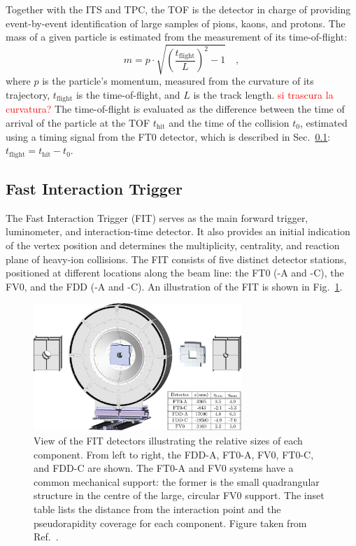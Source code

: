 Together with the ITS and TPC, the TOF is the detector in charge of providing event-by-event identification of large samples of pions, kaons, and protons. The mass of a given particle is estimated from the measurement of its time-of-flight:
\begin{equation}
    m = p \cdot \sqrt{\left(\frac{t_\mathrm{flight}}{L}\right)^2 - 1}\quad ,
\end{equation} 
where $p$ is the particle's momentum, measured from the curvature of its trajectory, $t_\mathrm{flight}$ is the time-of-flight, and $L$ is the track length. \textcolor{red}{si trascura la curvatura?} The time-of-flight is evaluated as the difference between the time of arrival of the particle at the TOF $t_\mathrm{hit}$ and the time of the collision $t_0$, estimated using a timing signal from the FT0 detector, which is described in Sec.~\ref{subsec:FIT}: $t_\mathrm{flight} = t_\mathrm{hit} - t_0$.

\subsection{Fast Interaction Trigger}\label{subsec:FIT}
The Fast Interaction Trigger (FIT) serves as the main forward trigger, luminometer, and interaction-time detector. It also provides an initial indication of the vertex position and determines the multiplicity, centrality, and reaction plane of heavy-ion collisions. The FIT consists of five distinct detector stations, positioned at different locations along the beam line: the FT0 (-A and -C), the FV0, and the FDD (-A and -C). An illustration of the FIT is shown in Fig.~\ref{fig:FIT}.

\begin{figure}[htb]
    \centering
    \includegraphics[width=0.7\textwidth]{Figures/Chapter 3/FIT_Scheme.png}
    \caption{View of the FIT detectors illustrating the relative sizes of each component. From left to right, the FDD-A, FT0-A, FV0, FT0-C, and FDD-C are shown. The FT0-A and FV0 systems have a common mechanical support: the former is the small quadrangular structure in the centre of the large, circular FV0 support. The inset table lists the distance from the interaction point and the pseudorapidity coverage for each component. Figure taken from Ref.~\cite{ALICE:2023udb}.}
    \label{fig:FIT}
\end{figure}


